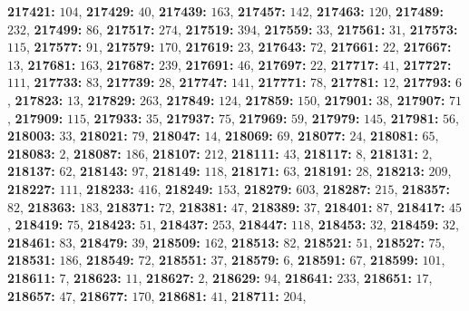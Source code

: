 \textsf{\bfseries 217421:} $104$, \textsf{\bfseries 217429:} $40$, \textsf{\bfseries 217439:} $163$, \textsf{\bfseries 217457:} $142$, \textsf{\bfseries 217463:} $120$, \textsf{\bfseries 217489:} $232$, \textsf{\bfseries 217499:} $86$, \textsf{\bfseries 217517:} $274$, \textsf{\bfseries 217519:} $394$, \textsf{\bfseries 217559:} $33$, \textsf{\bfseries 217561:} $31$, \textsf{\bfseries 217573:} $115$, \textsf{\bfseries 217577:} $91$, \textsf{\bfseries 217579:} $170$, \textsf{\bfseries 217619:} $23$, \textsf{\bfseries 217643:} $72$, \textsf{\bfseries 217661:} $22$, \textsf{\bfseries 217667:} $13$, \textsf{\bfseries 217681:} $163$, \textsf{\bfseries 217687:} $239$, \textsf{\bfseries 217691:} $46$, \textsf{\bfseries 217697:} $22$, \textsf{\bfseries 217717:} $41$, \textsf{\bfseries 217727:} $111$, \textsf{\bfseries 217733:} $83$, \textsf{\bfseries 217739:} $28$, \textsf{\bfseries 217747:} $141$, \textsf{\bfseries 217771:} $78$, \textsf{\bfseries 217781:} $12$, \textsf{\bfseries 217793:} $6$, \textsf{\bfseries 217823:} $13$, \textsf{\bfseries 217829:} $263$, \textsf{\bfseries 217849:} $124$, \textsf{\bfseries 217859:} $150$, \textsf{\bfseries 217901:} $38$, \textsf{\bfseries 217907:} $71$, \textsf{\bfseries 217909:} $115$, \textsf{\bfseries 217933:} $35$, \textsf{\bfseries 217937:} $75$, \textsf{\bfseries 217969:} $59$, \textsf{\bfseries 217979:} $145$, \textsf{\bfseries 217981:} $56$, \textsf{\bfseries 218003:} $33$, \textsf{\bfseries 218021:} $79$, \textsf{\bfseries 218047:} $14$, \textsf{\bfseries 218069:} $69$, \textsf{\bfseries 218077:} $24$, \textsf{\bfseries 218081:} $65$, \textsf{\bfseries 218083:} $2$, \textsf{\bfseries 218087:} $186$, \textsf{\bfseries 218107:} $212$, \textsf{\bfseries 218111:} $43$, \textsf{\bfseries 218117:} $8$, \textsf{\bfseries 218131:} $2$, \textsf{\bfseries 218137:} $62$, \textsf{\bfseries 218143:} $97$, \textsf{\bfseries 218149:} $118$, \textsf{\bfseries 218171:} $63$, \textsf{\bfseries 218191:} $28$, \textsf{\bfseries 218213:} $209$, \textsf{\bfseries 218227:} $111$, \textsf{\bfseries 218233:} $416$, \textsf{\bfseries 218249:} $153$, \textsf{\bfseries 218279:} $603$, \textsf{\bfseries 218287:} $215$, \textsf{\bfseries 218357:} $82$, \textsf{\bfseries 218363:} $183$, \textsf{\bfseries 218371:} $72$, \textsf{\bfseries 218381:} $47$, \textsf{\bfseries 218389:} $37$, \textsf{\bfseries 218401:} $87$, \textsf{\bfseries 218417:} $45$, \textsf{\bfseries 218419:} $75$, \textsf{\bfseries 218423:} $51$, \textsf{\bfseries 218437:} $253$, \textsf{\bfseries 218447:} $118$, \textsf{\bfseries 218453:} $32$, \textsf{\bfseries 218459:} $32$, \textsf{\bfseries 218461:} $83$, \textsf{\bfseries 218479:} $39$, \textsf{\bfseries 218509:} $162$, \textsf{\bfseries 218513:} $82$, \textsf{\bfseries 218521:} $51$, \textsf{\bfseries 218527:} $75$, \textsf{\bfseries 218531:} $186$, \textsf{\bfseries 218549:} $72$, \textsf{\bfseries 218551:} $37$, \textsf{\bfseries 218579:} $6$, \textsf{\bfseries 218591:} $67$, \textsf{\bfseries 218599:} $101$, \textsf{\bfseries 218611:} $7$, \textsf{\bfseries 218623:} $11$, \textsf{\bfseries 218627:} $2$, \textsf{\bfseries 218629:} $94$, \textsf{\bfseries 218641:} $233$, \textsf{\bfseries 218651:} $17$, \textsf{\bfseries 218657:} $47$, \textsf{\bfseries 218677:} $170$, \textsf{\bfseries 218681:} $41$, \textsf{\bfseries 218711:} $204$, 
